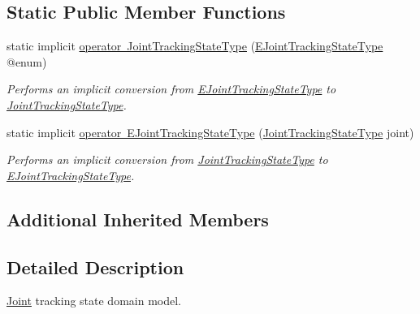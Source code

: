 \subsection*{Static Public Member Functions}
\begin{DoxyCompactItemize}
\item 
static implicit \mbox{\hyperlink{class_bar_none_1_1_shared_1_1_domain_model_1_1_joint_tracking_state_type_ac9ea994e7938b7f720410d878aadf668}{operator Joint\+Tracking\+State\+Type}} (\mbox{\hyperlink{namespace_bar_none_1_1_shared_1_1_domain_model_abfb99d1de9684cc3f024f727b2a2b487}{E\+Joint\+Tracking\+State\+Type}} @enum)
\begin{DoxyCompactList}\small\item\em Performs an implicit conversion from \mbox{\hyperlink{namespace_bar_none_1_1_shared_1_1_domain_model_abfb99d1de9684cc3f024f727b2a2b487}{E\+Joint\+Tracking\+State\+Type}} to \mbox{\hyperlink{class_bar_none_1_1_shared_1_1_domain_model_1_1_joint_tracking_state_type}{Joint\+Tracking\+State\+Type}}. \end{DoxyCompactList}\item 
static implicit \mbox{\hyperlink{class_bar_none_1_1_shared_1_1_domain_model_1_1_joint_tracking_state_type_a4dcda9a8ba330a9567c10d76b54c3663}{operator E\+Joint\+Tracking\+State\+Type}} (\mbox{\hyperlink{class_bar_none_1_1_shared_1_1_domain_model_1_1_joint_tracking_state_type}{Joint\+Tracking\+State\+Type}} joint)
\begin{DoxyCompactList}\small\item\em Performs an implicit conversion from \mbox{\hyperlink{class_bar_none_1_1_shared_1_1_domain_model_1_1_joint_tracking_state_type}{Joint\+Tracking\+State\+Type}} to \mbox{\hyperlink{namespace_bar_none_1_1_shared_1_1_domain_model_abfb99d1de9684cc3f024f727b2a2b487}{E\+Joint\+Tracking\+State\+Type}}. \end{DoxyCompactList}\end{DoxyCompactItemize}
\subsection*{Additional Inherited Members}


\subsection{Detailed Description}
\mbox{\hyperlink{class_bar_none_1_1_shared_1_1_domain_model_1_1_joint}{Joint}} tracking state domain model. 


